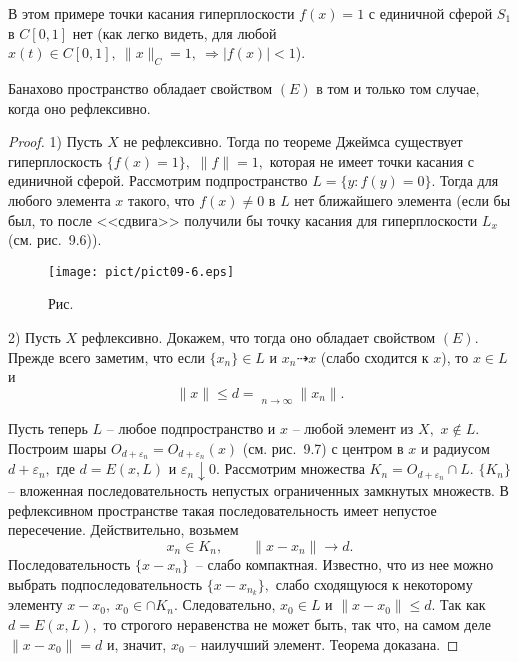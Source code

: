 {\begin{Example}
 \noindent В этом примере точки касания гиперплоскости $f(x)=1$ с единичной сферой
 $S_1$ в $C[0,1]$ нет (как легко видеть, для любой $x(t)\in C[0,1],~ \|x\|_C=1,~
 \Longrightarrow |f(x)|<1$).
 \end{Example}

 \begin{teo} %
 Банахово пространство обладает свойством $(E)$
 в том и только том случае, когда оно рефлексивно.
 \end{teo}

 \begin{proof} %
 1) Пусть $X$ не рефлексивно. Тогда по теореме Джеймса существует
 гиперплоскость $\{ f(x)=1\},$ {$\|f\|=1,$} которая не имеет точки касания с
 единичной сферой. Рассмотрим подпространство $L=\{{y}:f(y)=0\}.$
 Тогда для любого элемента $x$ такого, что $f(x)\ne 0$ в $L$
 нет ближайшего элемента (если бы был, то после
 <<сдвига>> получили бы точку касания для гиперплоскости $L_x$ {(см. рис.~9.6)}).

 \vspace{10mm}
\begin{figure}[ht]
\begin{center}
\texttt{[image: pict/pict09-6.eps]}
\end{center}
 \label{r9-6}

 \centerline{Рис.~\theris}
\end{figure}

 2) Пусть $X$ рефлексивно. Докажем, что тогда оно обладает свойством
 $(E).$ Прежде всего заметим, что если $\{ x_n\}\in L$ и $x_n \dashrightarrow x$
 (слабо сходится к $x$), то $x\in L$ и
 $$
 \|x\|\le d =
 \mathrel{\mathop{\underline{\lim}}\limits_{n\to \infty}} \|x_n\|.
 $$

 Пусть теперь $L$ -- любое подпространство и $x$ -- любой элемент из
 $X,$ {$x\not \in L.$} Построим шары $O_{d+\varepsilon_n}=O_{d+\varepsilon_n}(x)$ (см. рис.~9.7) с центром в $x$
 и радиусом $d+\varepsilon_n,$ где $d=E(x,L)$ и $\varepsilon_n
 \downarrow 0.$ Рассмотрим множества $K_n=O_{d+\varepsilon_n}\cap L.$
 $\{K_n\}$ -- вложенная последовательность непустых ограниченных
 замкнутых множеств.  В рефлексивном пространстве такая последовательность
 имеет непустое пересечение. Действительно, возьмем
 $$
 x_n\in K_n,\qquad \|x-x_n\| \longrightarrow d.
 $$
 Последовательность $\{x-x_n\}$~-- слабо компактная. Известно, что из нее можно
 выбрать подпоследовательность $\{x-x_{n_k}\},$
 слабо сходящуюся к некоторому элементу $x-x_0,\ x_0\in \cap K_n.$ Следовательно,
 $x_0\in L$ и $\|x-x_0\|\le
 d.$ Так как $d=E(x,L),$ то строгого неравенства не может быть, так что, на самом деле
 $\|x-x_0\|=d$ и, значит, $x_0$ -- наилучший элемент. Теорема доказана.
 \end{proof}

}
